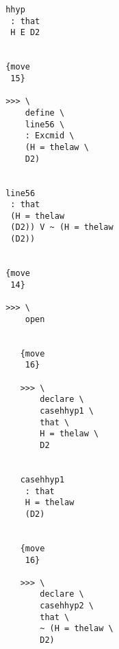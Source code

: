 \documentclass[12pt]{article}
\begin{document}
\begin{verbatim}
                                             hhyp 
                                              : that 
                                              H E D2


                                             {move 
                                              15}

                                             >>> \
                                                 define \
                                                 line56 \
                                                 : Excmid \
                                                 (H = thelaw \
                                                 D2)


                                             line56 
                                              : that 
                                              (H = thelaw 
                                              (D2)) V ~ (H = thelaw 
                                              (D2))


                                             {move 
                                              14}

                                             >>> \
                                                 open


                                                {move 
                                                 16}

                                                >>> \
                                                    declare \
                                                    casehhyp1 \
                                                    that \
                                                    H = thelaw \
                                                    D2


                                                casehhyp1 
                                                 : that 
                                                 H = thelaw 
                                                 (D2)


                                                {move 
                                                 16}

                                                >>> \
                                                    declare \
                                                    casehhyp2 \
                                                    that \
                                                    ~ (H = thelaw \
                                                    D2)



\end{verbatim}
\end{document}
